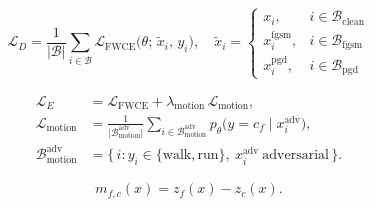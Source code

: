\begin{equation}\label{eq:variantD-loss}
  \mathcal{L}_{D} = \frac{1}{|\mathcal{B}|}\sum_{i\in\mathcal{B}} \mathcal{L}_{\mathrm{FWCE}}\big(\theta;\,\tilde{x}_i,\,y_i\big),
  \quad
  \tilde{x}_i=\begin{cases} x_i, & i\in\mathcal{B}_{\mathrm{clean}}\\ x_i^{\mathrm{fgsm}}, & i\in\mathcal{B}_{\mathrm{fgsm}}\\ x_i^{\mathrm{pgd}}, & i\in\mathcal{B}_{\mathrm{pgd}} \end{cases}
\end{equation}

\begin{align}
  \mathcal{L}_{E} &= \mathcal{L}_{\mathrm{FWCE}} + \lambda_{\mathrm{motion}}\,\mathcal{L}_{\mathrm{motion}}, \label{eq:variantE-loss}\\
  \mathcal{L}_{\mathrm{motion}} &= \frac{1}{\lvert\mathcal{B}^{\mathrm{adv}}_{\mathrm{motion}}\rvert}
     \sum_{i\in\mathcal{B}^{\mathrm{adv}}_{\mathrm{motion}}} p_\theta\!\big(y=c_f \mid x_i^{\mathrm{adv}}\big), \label{eq:variantE-motion}\\
  \mathcal{B}^{\mathrm{adv}}_{\mathrm{motion}} &= \{\,i : y_i\in\{\mathrm{walk},\mathrm{run}\},\ x_i^{\mathrm{adv}}\ \text{adversarial}\,\}. \label{eq:variantE-set}
\end{align}

\begin{equation}\label{eq:margin-def}
  m_{f,c}(x) = z_f(x) - z_c(x).
\end{equation}

